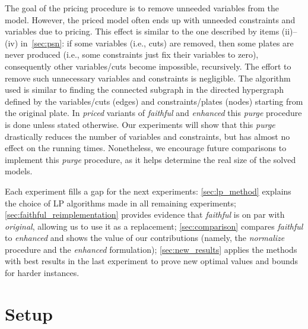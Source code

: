 \documentclass[ppgc,prop-tese,english,formais,babel]{iiufrgs}
\begin{document}
The goal of the pricing procedure is to remove unneeded variables from the model.
However, the priced model often ends up with unneeded constraints and variables due to pricing.
This effect is similar to the one described by items (ii)--(iv) in~\cref{sec:psn}: if some variables (i.e., cuts) are removed, then some plates are never produced (i.e., some constraints just fix their variables to zero), consequently other variables/cuts become impossible, recursively.
The effort to remove such unnecessary variables and constraints is negligible.
The algorithm used is similar to finding the connected subgraph in the directed hypergraph defined by the variables/cuts (edges) and constraints/plates (nodes) starting from the original plate.
In \emph{priced} variants of \emph{faithful} and \emph{enhanced} this \emph{purge} procedure is done unless stated otherwise.
Our experiments will show that this \emph{purge} drastically reduces the number of variables and constraints, but has almost no effect on the running times.
Nonetheless, we encourage future comparisons to implement this \emph{purge} procedure, as it helps determine the real size of the solved models.

Each experiment fills a gap for the next experiments:
\cref{sec:lp_method} explains the choice of LP algorithms made in all remaining experiments;
\cref{sec:faithful_reimplementation} provides evidence that \emph{faithful} is on par with \emph{original}, allowing us to use it as a replacement;
\cref{sec:comparison} compares \emph{faithful} to \emph{enhanced} and shows the value of our contributions (namely, the \emph{normalize} procedure and the \emph{enhanced} formulation);
\cref{sec:new_results} applies the methods with best results in the last experiment to prove new optimal values and bounds for harder instances.

\section{Setup}
\label{sec:setup}
\end{document}
